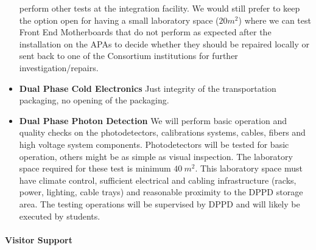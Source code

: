 \begin{itemize}
perform other tests at the integration facility. We would still prefer to keep the option open for 
having a small laboratory space ($20 m^2$) where we can test Front End Motherboards that do not 
perform as expected after the installation on the APAs to decide whether they should be repaired 
locally or sent back to one of the Consortium institutions for further investigation/repairs.
   \item {\bf Dual Phase Cold Electronics} Just integrity of the transportation packaging, 
no opening of the packaging.
   \item {\bf Dual Phase Photon Detection} We will perform basic operation and quality checks on 
the photodetectors, calibrations systems, cables, fibers and high voltage system components. 
Photodetectors will be tested for basic operation, others might be as simple as visual inspection. 
The laboratory space required for these test is minimum $40~m^2$. This laboratory space must 
have climate control, sufficient electrical and cabling infrastructure (racks, power, lighting, cable 
trays) and reasonable proximity to the DPPD storage area. The testing operations will be supervised 
by DPPD and will likely be executed by students.
\end{itemize}

\paragraph{\bf Visitor Support} 

